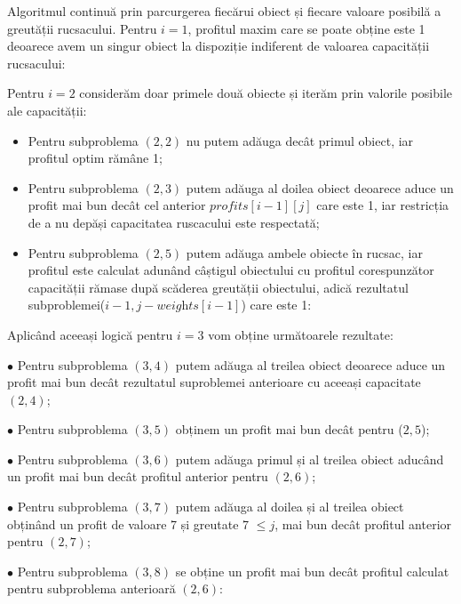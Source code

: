 \begin{sloppypar}
Algoritmul continuă prin parcurgerea fiecărui obiect și fiecare valoare posibilă a greutății rucsacului. Pentru $i = 1$, profitul maxim care se poate obține este 1 deoarece avem un singur obiect la dispoziție indiferent de valoarea capacității rucsacului: 


Pentru $i = 2$ considerăm doar primele două obiecte și iterăm prin valorile posibile ale capacității: \par
\begin{itemize}
\item Pentru subproblema $(2,2)$ nu putem adăuga decât primul obiect, iar profitul optim rămâne 1; 
\item Pentru subproblema $(2, 3)$ putem adăuga al doilea obiect deoarece aduce un profit mai bun decât cel anterior $\textit{profits}[i - 1][j]$ care este 1, iar restricția de a nu depăși capacitatea ruscacului este respectată; 
\item Pentru subproblema $(2, 5)$ putem adăuga ambele obiecte în rucsac, iar profitul este calculat adunând câștigul obiectului cu profitul corespunzător capacității rămase după scăderea greutății obiectului, adică rezultatul subproblemei($i - 1, j - \textit{weights}[i - 1]$) care este 1: 
\end{itemize}


Aplicând aceeași logică pentru $i = 3$ vom obține următoarele rezultate: \par
$\bullet$ Pentru subproblema $(3, 4)$ putem adăuga al treilea obiect deoarece aduce un profit mai bun decât rezultatul suproblemei anterioare cu aceeași capacitate $(2, 4)$; \par
$\bullet$ Pentru subproblema $(3, 5)$ obținem un profit mai bun decât pentru ($2, 5$); \par
$\bullet$ Pentru subproblema $(3, 6)$ putem adăuga primul și al treilea obiect aducând un profit mai bun decât profitul anterior pentru $(2, 6)$; \par
$\bullet$ Pentru subproblema $(3, 7)$ putem adăuga al doilea și al treilea obiect obținând un profit de valoare 7 și greutate 7 $ \le j$, mai bun decât profitul anterior pentru $(2, 7)$; \par
$\bullet$ Pentru subproblema $(3, 8)$ se obține un profit mai bun decât profitul calculat pentru subproblema anterioară $(2, 6)$: \par


\end{sloppypar}

